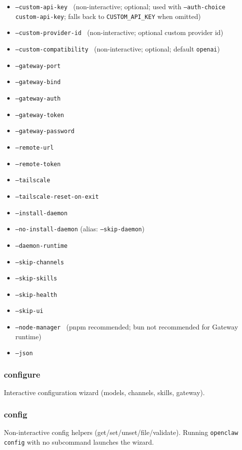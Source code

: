 \begin{itemize}
  \item \texttt{--custom-api-key } (non-interactive; optional; used with \texttt{--auth-choice custom-api-key}; falls back to \texttt{CUSTOM\_API\_KEY} when omitted)
  \item \texttt{--custom-provider-id } (non-interactive; optional custom provider id)
  \item \texttt{--custom-compatibility } (non-interactive; optional; default \texttt{openai})
  \item \texttt{--gateway-port }
  \item \texttt{--gateway-bind }
  \item \texttt{--gateway-auth }
  \item \texttt{--gateway-token }
  \item \texttt{--gateway-password }
  \item \texttt{--remote-url }
  \item \texttt{--remote-token }
  \item \texttt{--tailscale }
  \item \texttt{--tailscale-reset-on-exit}
  \item \texttt{--install-daemon}
  \item \texttt{--no-install-daemon} (alias: \texttt{--skip-daemon})
  \item \texttt{--daemon-runtime }
  \item \texttt{--skip-channels}
  \item \texttt{--skip-skills}
  \item \texttt{--skip-health}
  \item \texttt{--skip-ui}
  \item \texttt{--node-manager } (pnpm recommended; bun not recommended for Gateway runtime)
  \item \texttt{--json}
\end{itemize}


\subsubsection{configure}


Interactive configuration wizard (models, channels, skills, gateway).

\subsubsection{config}


Non-interactive config helpers (get/set/unset/file/validate). Running \texttt{openclaw config} with no
subcommand launches the wizard.

